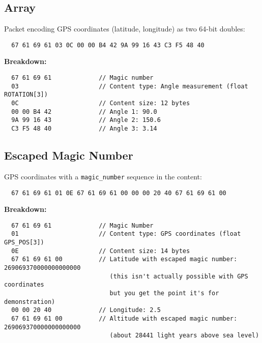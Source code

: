 \documentclass[a4paper]{article}
\begin{document}
\subsection{Array}
Packet encoding GPS coordinates (latitude, longitude) as two 64-bit doubles:
\begin{verbatim}
  67 61 69 61 03 0C 00 00 B4 42 9A 99 16 43 C3 F5 48 40
\end{verbatim}
\textbf{Breakdown:}
\begin{verbatim}
  67 61 69 61             // Magic number
  03                      // Content type: Angle measurement (float ROTATION[3])
  0C                      // Content size: 12 bytes
  00 00 B4 42             // Angle 1: 90.0
  9A 99 16 43             // Angle 2: 150.6
  C3 F5 48 40             // Angle 3: 3.14
\end{verbatim}

\subsection{Escaped Magic Number}
GPS coordinates with a \texttt{magic\_number} sequence in the content:
\begin{verbatim}
  67 61 69 61 01 0E 67 61 69 61 00 00 00 20 40 67 61 69 61 00
\end{verbatim}
\textbf{Breakdown:}
\begin{verbatim}
  67 61 69 61             // Magic Number
  01                      // Content type: GPS coordinates (float GPS_POS[3])
  0E                      // Content size: 14 bytes
  67 61 69 61 00          // Latitude with escaped magic number: 269069370000000000000 
                             (this isn't actually possible with GPS coordinates
                             but you get the point it's for demonstration)
  00 00 20 40             // Longitude: 2.5
  67 61 69 61 00          // Altitude with escaped magic number: 269069370000000000000
                             (about 28441 light years above sea level)
\end{verbatim}
\end{document}

